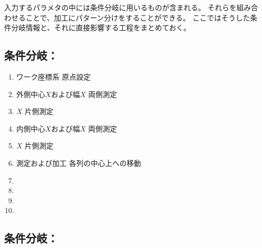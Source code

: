 

入力するパラメタの中には条件分岐に用いるものが含まれる。
それらを組み合わせることで、加工にパターン分けをすることができる。
ここではそうした条件分岐情報と、それに直接影響する工程をまとめておく。





\subsection{条件分岐：\PMCenterCurvatureExists}

\begin{enumerate}[label=\sarrow]
\item ワーク座標系 原点設定
\item 外側中心$X$および幅$X$ 両側測定
\item \KeywayCenter$X$ 片側測定
\item 内側中心$X$および幅$X$ 両側測定
\item \OutcutCenter$X$ 片側測定
\item \indexDimpleMeasurement\indexDimpleMilling\nameDimple 測定および加工 各列の中心上への移動
\item \KeywayMilling
\item \EndFaceOutChamferMilling
\item \EndFaceInChamferMilling
\item \ReliefGrooveMilling
\end{enumerate}


\subsection{条件分岐：\PMBottomALBracketDimensionExists}

